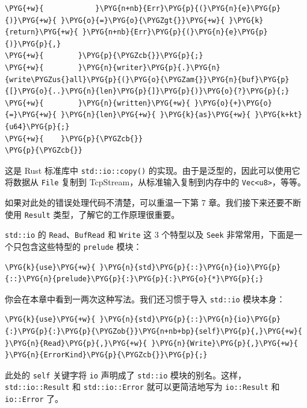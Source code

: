 \begin{Verbatim}[commandchars=\\\{\},breaklines=true,breakanywhere=true,fontsize=\codefont,xleftmargin=17bp]
\PYG{+w}{            }\PYG{n+nb}{Err}\PYG{p}{(}\PYG{n}{e}\PYG{p}{)}\PYG{+w}{ }\PYG{o}{=}\PYG{o}{\PYGZgt{}}\PYG{+w}{ }\PYG{k}{return}\PYG{+w}{ }\PYG{n+nb}{Err}\PYG{p}{(}\PYG{n}{e}\PYG{p}{)}\PYG{p}{,}
\PYG{+w}{        }\PYG{p}{\PYGZcb{}}\PYG{p}{;}
\PYG{+w}{        }\PYG{n}{writer}\PYG{p}{.}\PYG{n}{write\PYGZus{}all}\PYG{p}{(}\PYG{o}{\PYGZam{}}\PYG{n}{buf}\PYG{p}{[}\PYG{o}{..}\PYG{n}{len}\PYG{p}{]}\PYG{p}{)}\PYG{o}{?}\PYG{p}{;}
\PYG{+w}{        }\PYG{n}{written}\PYG{+w}{ }\PYG{o}{+}\PYG{o}{=}\PYG{+w}{ }\PYG{n}{len}\PYG{+w}{ }\PYG{k}{as}\PYG{+w}{ }\PYG{k+kt}{u64}\PYG{p}{;}
\PYG{+w}{    }\PYG{p}{\PYGZcb{}}
\PYG{p}{\PYGZcb{}}
\end{Verbatim}

这是 Rust 标准库中 \texttt{std::io::copy()} 的实现。由于是泛型的，因此可以使用它将数据从 \texttt{File} 复制到 TcpStream，从标准输入复制到内存中的 \texttt{Vec<u8>}，等等。

如果对此处的错误处理代码不清楚，可以重温一下第 7 章。我们接下来还要不断使用 \texttt{Result} 类型，了解它的工作原理很重要。

\texttt{std::io} 的 \texttt{Read}、\texttt{BufRead} 和 \texttt{Write} 这 3 个特型以及 \texttt{Seek} 非常常用，下面是一个只包含这些特型的 \texttt{prelude} 模块：

\begin{Verbatim}[commandchars=\\\{\},breaklines=true,breakanywhere=true,fontsize=\codefont,xleftmargin=17bp]
\PYG{k}{use}\PYG{+w}{ }\PYG{n}{std}\PYG{p}{::}\PYG{n}{io}\PYG{p}{::}\PYG{n}{prelude}\PYG{p}{:}\PYG{p}{:}\PYG{o}{*}\PYG{p}{;}
\end{Verbatim}

你会在本章中看到一两次这种写法。我们还习惯于导入 \texttt{std::io} 模块本身：

\begin{Verbatim}[commandchars=\\\{\},breaklines=true,breakanywhere=true,fontsize=\codefont,xleftmargin=17bp]
\PYG{k}{use}\PYG{+w}{ }\PYG{n}{std}\PYG{p}{::}\PYG{n}{io}\PYG{p}{:}\PYG{p}{:}\PYG{p}{\PYGZob{}}\PYG{n+nb+bp}{self}\PYG{p}{,}\PYG{+w}{ }\PYG{n}{Read}\PYG{p}{,}\PYG{+w}{ }\PYG{n}{Write}\PYG{p}{,}\PYG{+w}{ }\PYG{n}{ErrorKind}\PYG{p}{\PYGZcb{}}\PYG{p}{;}
\end{Verbatim}

此处的 \texttt{self} 关键字将 \texttt{io} 声明成了 \texttt{std::io} 模块的别名。这样，\texttt{std::io::Result} 和 \texttt{std::io::Error} 就可以更简洁地写为 \texttt{io::Result} 和 \texttt{io::Error} 了。

